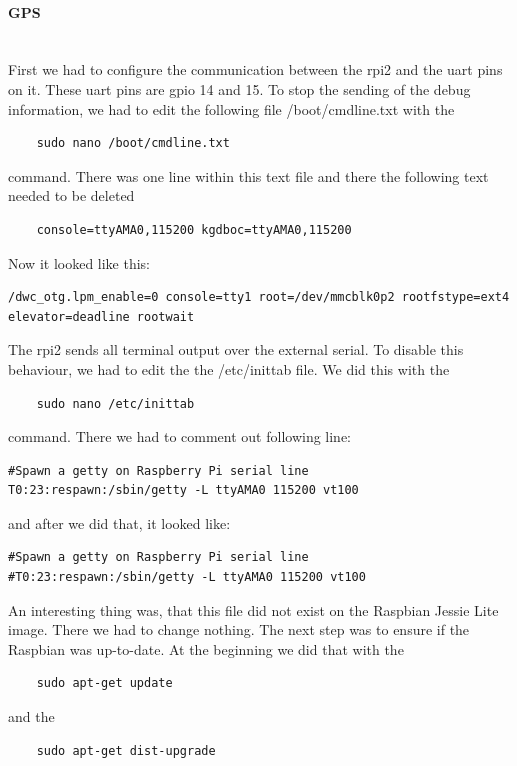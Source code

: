 \paragraph{GPS} \mbox{}\\
First we had to configure the communication between the \gls{rpi2} and the \gls{uart} pins on it. These \gls{uart} pins are \gls{gpio} 14 and 15.\newline
To stop the sending of the debug information, we had to edit the following file /boot/cmdline.txt with the 
\begin{verbatim}
	sudo nano /boot/cmdline.txt
\end{verbatim}
command.\newline
There was one line within this text file and there the following text needed to be deleted
\begin{verbatim}
	console=ttyAMA0,115200 kgdboc=ttyAMA0,115200
\end{verbatim}
Now it looked like this: 
\begin{verbatim}
/dwc_otg.lpm_enable=0 console=tty1 root=/dev/mmcblk0p2 rootfstype=ext4 
elevator=deadline rootwait
\end{verbatim}
The \gls{rpi2} sends all terminal output over the external serial. To disable this behaviour, we had to edit the the /etc/inittab file. We did this with the 
\begin{verbatim}
	sudo nano /etc/inittab
\end{verbatim}
command.\newline
There we had to comment out following line:
\begin{verbatim}
#Spawn a getty on Raspberry Pi serial line
T0:23:respawn:/sbin/getty -L ttyAMA0 115200 vt100
\end{verbatim}
and after we did that, it looked like:
\begin{verbatim}
#Spawn a getty on Raspberry Pi serial line
#T0:23:respawn:/sbin/getty -L ttyAMA0 115200 vt100
\end{verbatim}
An interesting thing was, that this file did not exist on the Raspbian Jessie Lite image. There we had to change nothing.\newline
The next step was to ensure if the Raspbian was up-to-date. At the beginning we did that with the 
\begin{verbatim}
	sudo apt-get update
\end{verbatim}
and the 
\begin{verbatim}
	sudo apt-get dist-upgrade
\end{verbatim}
